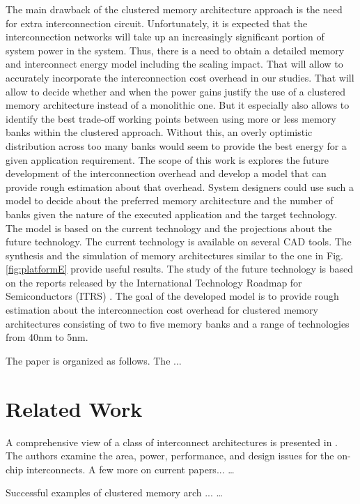  The main drawback of the clustered memory architecture approach is the need for extra interconnection circuit.
 Unfortunately, it is expected that the interconnection networks will take up an increasingly significant portion of system power in the system. 
Thus, there is a need to obtain a detailed memory and interconnect energy model including the scaling impact. 
That will allow to accurately incorporate the interconnection cost overhead in our studies. 
That will allow to decide whether and when the power gains justify the use of a clustered memory architecture instead of a monolithic one. 
But it especially also allows to identify the best trade-off working points between using more
or less memory banks within the clustered approach. 
Without this, an overly optimistic distribution across too many banks would seem to provide the
best energy for a given application requirement.
  The scope of this work is explores the future development of the interconnection overhead and develop a model that can provide rough estimation about that overhead.
  System designers could use such a model to decide about the preferred memory architecture and the number of banks given the nature of the executed application and the target technology.
  The model is based on the current technology and the projections about the future technology.
  The current technology is available on several CAD tools.
  The synthesis and the simulation of memory architectures similar to the one in Fig.\ref{fig:platformE} provide useful results.
  The study of the future technology is based on the reports released by the International Technology Roadmap for Semiconductors (ITRS) \cite{itrs}.
 The goal of the developed model is to provide rough estimation about the interconnection cost overhead for clustered memory architectures consisting of two to five memory banks and a range of technologies from 40nm to 5nm.  
 
 The paper is organized as follows. The ...

\section{Related Work}

A comprehensive view of a class of interconnect architectures is presented in \cite{kumar2005interconnections}. 
The authors examine the area, power, performance, and design issues for the on-chip interconnects.
A few more on current papers... \ldots

Successful examples of clustered memory arch ... \ldots

